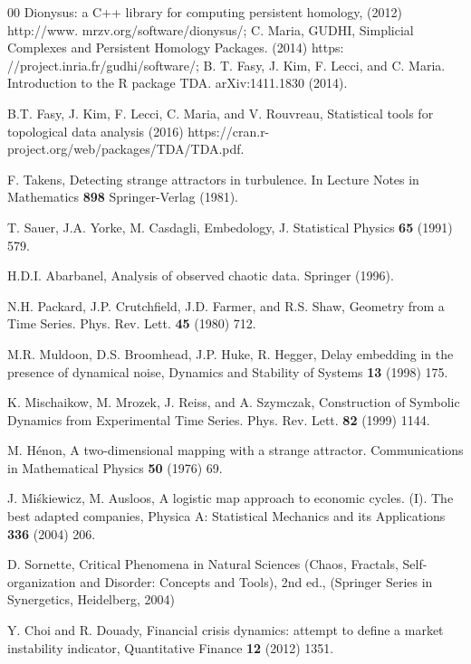 \documentclass[preprint,12pt]{elsarticle}
\theoremstyle{definition}
\theoremstyle{remark}
\numberwithin{equation}{section}
\theoremstyle{definition}
\begin{document}
\begin{thebibliography}{00}
  Dionysus: a C++ library for computing persistent homology,  (2012) http://www. mrzv.org/software/dionysus/; C. Maria, GUDHI, Simplicial Complexes and Persistent Homology Packages. (2014) https: //project.inria.fr/gudhi/software/; B. T. Fasy, J. Kim, F. Lecci, and C. Maria. Introduction to the R package TDA. arXiv:1411.1830 (2014).



  B.T. Fasy, J. Kim, F. Lecci, C. Maria, and V. Rouvreau, Statistical tools for topological data analysis  (2016)  https://cran.r-project.org/web/packages/TDA/TDA.pdf.

 F. Takens, Detecting strange attractors in turbulence. In Lecture Notes in Mathematics \textbf{898} Springer-Verlag  (1981).


 T. Sauer, J.A. Yorke, M. Casdagli, Embedology, J. Statistical Physics \textbf{65} (1991) 579.

  H.D.I. Abarbanel, Analysis of observed chaotic data. Springer (1996).

 N.H. Packard, J.P. Crutchfield, J.D. Farmer, and R.S. Shaw,
Geometry from a Time Series. Phys. Rev. Lett. \textbf{45} (1980) 712.

 M.R. Muldoon, D.S. Broomhead, J.P. Huke, R. Hegger, Delay embedding in the presence of dynamical noise, Dynamics and Stability of Systems \textbf{13} (1998) 175.


 K. Mischaikow, M. Mrozek, J. Reiss, and A. Szymczak,
Construction of Symbolic Dynamics from Experimental Time Series.
Phys. Rev. Lett. \textbf{82}  (1999)  1144.


 M. H\'enon, A two-dimensional mapping with a strange attractor. Communications in Mathematical Physics \textbf{50}  (1976) 69.

 J. Mi\'skiewicz, M. Ausloos, A logistic map approach to economic cycles. (I). The best adapted companies, Physica A: Statistical Mechanics and its Applications \textbf{336} (2004)  206.

 D. Sornette,
Critical Phenomena in Natural Sciences (Chaos, Fractals, Self-organization and Disorder: Concepts and Tools),
2nd ed., (Springer Series in Synergetics, Heidelberg, 2004)

 Y. Choi and  R. Douady, Financial crisis dynamics: attempt to define a market instability indicator, Quantitative Finance \textbf{12} (2012) 1351.



\end{thebibliography}
\end{document}
